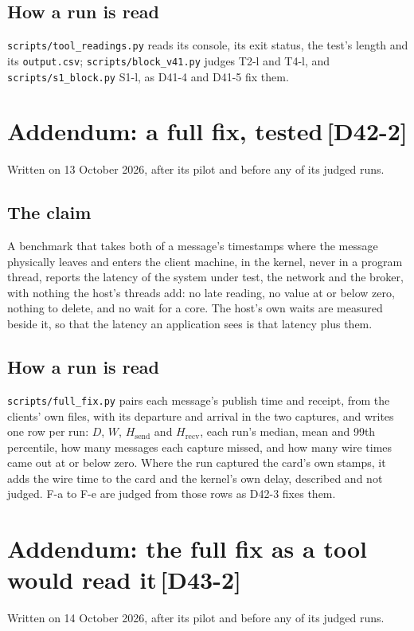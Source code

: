 \documentclass[11pt]{article}
\newcommand{\chg}[1]{\,{\color{chgcol}\bfseries\footnotesize[#1]}}
\newcommand{\chgold}[1]{\,{\color{oldcol}\bfseries\footnotesize[#1]}}
\begin{document}
\subsection*{How a run is read}
\texttt{scripts/tool\_readings.py} reads its console, its exit status, the test's length and its
\texttt{output.csv}; \texttt{scripts/block\_v41.py} judges T2-l and T4-l, and
\texttt{scripts/s1\_block.py} S1-l, as D41-4 and D41-5 fix them.

\section[Addendum: a full fix, tested]{Addendum: a full fix, tested\protect\chgold{D42-2}}\label{sec:addendum-v42}
Written on 13 October 2026, after its pilot and before any of its judged runs.

\subsection*{The claim}
A benchmark that takes both of a message's timestamps where the message physically leaves and
enters the client machine, in the kernel, never in a program thread, reports the latency of the
system under test, the network and the broker, with nothing the host's threads add: no late
reading, no value at or below zero, nothing to delete, and no wait for a core. The host's own waits
are measured beside it, so that the latency an application sees is that latency plus them.

\subsection*{How a run is read}
\texttt{scripts/full\_fix.py} pairs each message's publish time and receipt, from the clients' own
files, with its departure and arrival in the two captures, and writes one row per run: $D$, $W$,
$H_{\mathrm{send}}$ and $H_{\mathrm{recv}}$, each run's median, mean and 99th percentile, how many
messages each capture missed, and how many wire times came out at or below zero. Where the run
captured the card's own stamps, it adds the wire time to the card and the kernel's own delay,
described and not judged. F-a to F-e are judged from those rows as D42-3 fixes them.

\section[Addendum: the full fix as a tool would read it]{Addendum: the full fix as a tool would read it\protect\chg{D43-2}}\label{sec:addendum-v43}
Written on 14 October 2026, after its pilot and before any of its judged runs.
\end{document}
